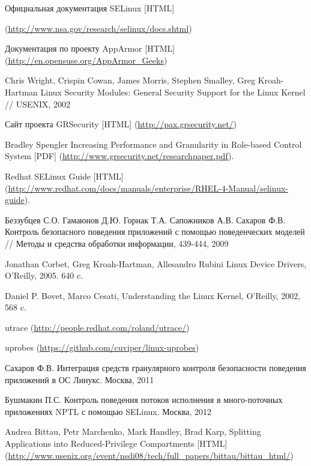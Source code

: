 \begin{thebibliography}{99}
Официальная документация SELinux [HTML] 

(\url{http://www.nsa.gov/research/selinux/docs.shtml})

Документация по проекту AppArmor [HTML]
(\url{http://en.opensuse.org/AppArmor\_Geeks})

Chris Wright, Crispin Cowan, James Morris, Stephen Smalley, Greg
Kroah-Hartman
Linux Security Modules: General Security Support for the Linux Kernel 
// USENIX, 2002

Сайт проекта GRSecurity [HTML] 
(\url{http://pax.grsecurity.net/})

Bradley Spengler Increasing Performance and Granularity
in Role-based Control System [PDF]
(\url{http://www.grsecurity.net/researchpaper.pdf}).

 Redhat SELinux Guide [HTML]
 (\url{http://www.redhat.com/docs/manuals/enterprise/RHEL-4-Manual/selinux-guide}).

Беззубцев С.О. Гамаюнов Д.Ю. Горнак Т.А. Сапожников А.В.
Сахаров Ф.В. Контроль безопасного поведения приложений
с помощью поведенческих моделей // Методы и средства обработки информации, 439-444, 2009

Jonathan Corbet, Greg Kroah-Hartman, Allesandro Rubini Linux Device Drivers, O'Reilly, 2005. 640 c.

Daniel P. Bovet, Marco Cesati, Understanding the Linux Kernel, O'Reilly, 2002, 568 c.
 
utrace
(\url{http://people.redhat.com/roland/utrace/})

uprobes
(\url{https://github.com/cuviper/linux-uprobes})

Сахаров Ф.В. Интеграция средств гранулярного контроля безопасности
поведения приложений в ОС Линукс. Москва, 2011

Бушмакин П.С. Контроль поведения потоков исполнения в много-поточных
приложениях NPTL с помощью SELinux. Москва, 2012


Andrea Bittau, Petr Marchenko, Mark Handley, Brad Karp,
Splitting Applications into Reduced-Privilege Compartments [HTML]
(\url{http://www.usenix.org/event/nsdi08/tech/full\_papers/bittau/bittau\_html/}) 

\end{thebibliography}
